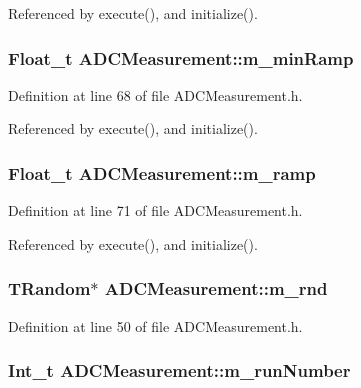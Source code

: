Referenced by execute(), and initialize().\hypertarget{classADCMeasurement_ab015017d6a05ac4711836ceb1e072a85}{
\subsubsection[{m\_\-minRamp}]{\setlength{\rightskip}{0pt plus 5cm}Float\_\-t {\bf ADCMeasurement::m\_\-minRamp}}}
\label{classADCMeasurement_ab015017d6a05ac4711836ceb1e072a85}


Definition at line 68 of file ADCMeasurement.h.

Referenced by execute(), and initialize().\hypertarget{classADCMeasurement_ac84ed2ba70f38e73ec0eec1de65bbdca}{
\subsubsection[{m\_\-ramp}]{\setlength{\rightskip}{0pt plus 5cm}Float\_\-t {\bf ADCMeasurement::m\_\-ramp}}}
\label{classADCMeasurement_ac84ed2ba70f38e73ec0eec1de65bbdca}


Definition at line 71 of file ADCMeasurement.h.

Referenced by execute(), and initialize().\hypertarget{classADCMeasurement_acdced9621e4b56d6772b8b34060b0a9d}{
\subsubsection[{m\_\-rnd}]{\setlength{\rightskip}{0pt plus 5cm}TRandom$\ast$ {\bf ADCMeasurement::m\_\-rnd}}}
\label{classADCMeasurement_acdced9621e4b56d6772b8b34060b0a9d}


Definition at line 50 of file ADCMeasurement.h.\hypertarget{classADCMeasurement_aba8bc92a86954118babdc49b612a2412}{
\subsubsection[{m\_\-runNumber}]{\setlength{\rightskip}{0pt plus 5cm}Int\_\-t {\bf ADCMeasurement::m\_\-runNumber}}}
\label{classADCMeasurement_aba8bc92a86954118babdc49b612a2412}


